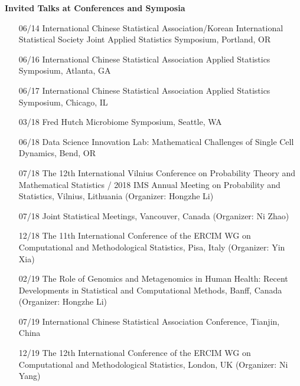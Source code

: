 \documentclass[10pt]{article}
\begin{document}
\textbf{Invited Talks at Conferences and Symposia}
\begin{enumerate}  
\item[06/14] International Chinese Statistical Association/Korean International Statistical Society Joint Applied Statistics Symposium, Portland, OR 
\item[06/16] International Chinese Statistical Association Applied Statistics Symposium, Atlanta, GA 
\item[06/17] International Chinese Statistical Association Applied Statistics Symposium, Chicago, IL
\item[03/18] Fred Hutch Microbiome Symposium, Seattle, WA 
\item[06/18] Data Science Innovation Lab: Mathematical Challenges of Single Cell Dynamics, Bend, OR
\item[07/18] The 12th International Vilnius Conference on Probability Theory and Mathematical Statistics / 2018 IMS Annual Meeting on Probability and Statistics, Vilnius, Lithuania (Organizer: Hongzhe Li)
\item[07/18] Joint Statistical Meetings, Vancouver, Canada (Organizer: Ni Zhao)
\item[12/18] The 11th International Conference of the ERCIM WG on Computational and Methodological Statistics, Pisa, Italy (Organizer: Yin Xia)
\item[02/19] The Role of Genomics and Metagenomics in Human Health: Recent Developments in Statistical and Computational Methods, Banff, Canada (Organizer: Hongzhe Li)
\item[07/19] International Chinese Statistical Association Conference, Tianjin, China
\item[12/19] The 12th International Conference of the ERCIM WG on Computational and Methodological Statistics, London, UK (Organizer: Ni Yang)

\end{enumerate}
\end{document}
